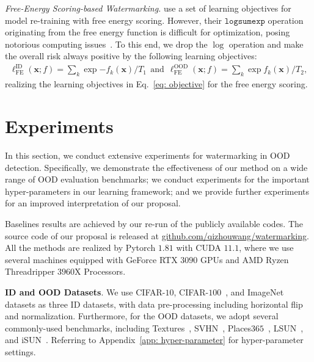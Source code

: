 \documentclass{article}
\begin{document}
\textit{Free-Energy Scoring-based Watermarking.} \cite{liu2020energy} use a set of learning objectives for model re-training with free energy scoring. However, their $\texttt{logsumexp}$ operation originating from the free energy function is difficult for optimization, posing notorious computing issues~\cite{mann2006numerically}. To this end, we drop the $\log$ operation and make the overall risk always positive by the following learning objectives:
\begin{align}{
    \ell^\text{ID}_\text{FE} (\boldsymbol{x};f)=\sum_k \exp {-f_k(\boldsymbol{x})}/{T_1}~~\text{and}~~
    \ell^\text{OOD}_\text{FE} (\boldsymbol{x};f)=\sum_k \exp {f_k(\boldsymbol{x})}/{T_2},} \label{eq:obj_eng}
\end{align}
realizing the learning objectives in Eq.~\eqref{eq: objective} for the free energy scoring. 


\section{Experiments} \label{sec: experiment}

In this section, we conduct extensive experiments for watermarking in OOD detection. Specifically, we demonstrate the effectiveness of our method on a wide range of OOD evaluation benchmarks; we conduct experiments for the important hyper-parameters in our learning framework; and we provide further experiments for an improved interpretation of our proposal. 

Baselines results are achieved by our re-run of the publicly available codes. The source code of our proposal is released at  \href{https://github.com/QizhouWang/watermarking}{github.com/qizhouwang/watermarking}.
All the methods are realized by Pytorch $1.81$ with CUDA $11.1$, where we use several machines equipped with GeForce RTX $3090$ GPUs and AMD Ryzen Threadripper $3960$X Processors. 



\textbf{ID and OOD Datasets}. We use CIFAR-$10$, CIFAR-$100$~\cite{krizhevsky2009learning}, and ImageNet~\cite{ILSVRC15} datasets as three ID datasets, with data pre-processing including horizontal flip and normalization. Furthermore, for the OOD datasets, we adopt several commonly-used benchmarks, including Textures~\cite{cimpoi2014describing}, SVHN~\cite{netzer2011reading}, Places$365$~\cite{ZhouLKO018}, LSUN~\cite{yu2015lsun}, and iSUN~\cite{xu2015turkergaze}. Referring to Appendix~\ref{app: hyper-parameter} for hyper-parameter settings. 
\end{document}
